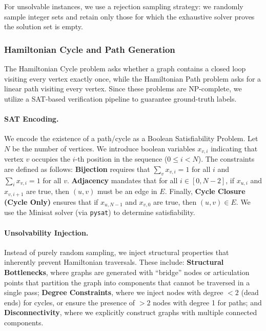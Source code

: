 For unsolvable instances, we use a rejection sampling strategy: we randomly sample integer sets and retain only those for which the exhaustive solver proves the solution set is empty.



\subsubsection{Hamiltonian Cycle and Path Generation}

The Hamiltonian Cycle problem asks whether a graph contains a closed loop visiting every vertex exactly once, while the Hamiltonian Path problem asks for a linear path visiting every vertex. Since these problems are NP-complete, we utilize a SAT-based verification pipeline to guarantee ground-truth labels.

\paragraph{SAT Encoding.} We encode the existence of a path/cycle as a Boolean Satisfiability Problem. Let $N$ be the number of vertices. We introduce boolean variables $x_{v,i}$ indicating that vertex $v$ occupies the $i$-th position in the sequence ($0 \le i < N$). The constraints are defined as follows: \textbf{Bijection} requires that $\sum_v x_{v,i} = 1$ for all $i$ and $\sum_i x_{v,i} = 1$ for all $v$. \textbf{Adjacency} mandates that for all $i \in [0, N-2]$, if $x_{u,i}$ and $x_{v,i+1}$ are true, then $(u,v)$ must be an edge in $E$. Finally, \textbf{Cycle Closure (Cycle Only)} ensures that if $x_{u, N-1}$ and $x_{v, 0}$ are true, then $(u,v) \in E$. We use the Minisat solver (via \texttt{pysat}) to determine satisfiability.

\paragraph{Unsolvability Injection.} Instead of purely random sampling, we inject structural properties that inherently prevent Hamiltonian traversals. These include: \textbf{Structural Bottlenecks}, where graphs are generated with ``bridge'' nodes or articulation points that partition the graph into components that cannot be traversed in a single pass; \textbf{Degree Constraints}, where we inject nodes with degree $<2$ (dead ends) for cycles, or ensure the presence of $>2$ nodes with degree 1 for paths; and \textbf{Disconnectivity}, where we explicitly construct graphs with multiple connected components.


